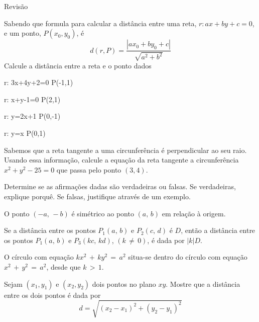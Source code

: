 \begin{exercicios}{Revisão}
    \begin{exercicio}
        Sabendo que formula para calcular a distância entre uma reta, $r:ax+by+c=0$, e um ponto, $P(x_0,y_0)$, é
        \[d(r,P) = \frac{|ax_0+by_0+c|}{\sqrt{a^2+b^2}}\]
        Calcule a distância entre a reta e o ponto dados
        \begin{mathlist}
            \item r: 3x+4y+2=0 \) \tabto{33mm} P(-1,1)
            \item r: x+y-1=0   \) \tabto{33mm} P(2,1)
            \item r: y=2x+1    \) \tabto{33mm} P(0,-1)
            \item r: y=x       \) \tabto{33mm} P(0,1)
        \end{mathlist}
    \end{exercicio}

    \begin{exercicio}
        Sabemos que a reta tangente a uma circunferência é perpendicular ao seu raio.
        Usando essa informação, calcule a equação da reta tangente a circunferência 
        $x^2+y^2-25=0$ que passa pelo ponto $(3,4)$.
    \end{exercicio}
        
    \begin{exercicio}
        Determine se as afirmações dadas são verdadeiras ou falsas. 
        Se verdadeiras, explique porquê. Se falsas, justifique através de um exemplo.
        \begin{alphalist}
            \item O ponto $(-a, \, -b)$ é simétrico ao ponto $(a, \, b)$ em relação à origem.
            \item Se a distância entre os pontos $P_1 (a, \, b)$ e $P_ 2 (c, \, d)$ é $D$, 
                então a distância entre os pontos 
                $P_1 (a, \, b)$ e $P_3 (kc, \, kd)$, $(k \, \neq \, 0)$, é dada por $|k| D$.
            \item O círculo com equação $kx^2 \, + \, ky^2 \, = \, a^2$ situa-se dentro do 
                círculo com equação $x^2 \, + \, y^2 \, = \, a^2$, desde que $k \, > \, 1$.
            \item Sejam $(x_1, y_1)$ e $(x_2, y_2)$ dois pontos no plano $xy$. 
                Mostre que a distância entre os dois pontos é dada por
                \[d = \sqrt{(x_2 - x_1)^2 + (y_2 - y_1)^2}\]
        \end{alphalist}        
    \end{exercicio}
        

\end{exercicios}
